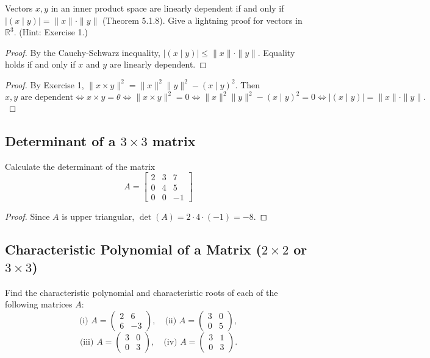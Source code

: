 \begin{tcolorbox}[title=Problem 5, breakable]
    Vectors $x, y$ in an inner product space are linearly dependent
    if and only if $|(x \mid y)| = \|x\| \cdot \|y\|$ (Theorem 5.1.8).
    Give a lightning proof for vectors in $\mathbb{R}^3$. (Hint: Exercise 1.)
\end{tcolorbox}

\begin{proof}
    By the Cauchy-Schwarz inequality, $|(x \mid y)| \le \|x\| \cdot \|y\|$.
    Equality holds if and only if $x$ and $y$ are linearly dependent.
\end{proof}

\begin{proof}
    By Exercise 1, $\|x \times y\|^2 = \|x\|^2\|y\|^2 - (x \mid y)^2$. Then
    \[x, y \text{ are dependent} \iff x \times y = \theta \iff \|x \times y\|^2 = 0 \iff \|x\|^2\|y\|^2 - (x \mid y)^2 = 0 \iff |(x \mid y)| = \|x\| \cdot \|y\|.\]
\end{proof}

\subsection{Determinant of a $3 \times 3$ matrix}

\begin{tcolorbox}[title=Problem 7, breakable]
    Calculate the determinant of the matrix 
    \[
    A = 
    \begin{bmatrix}
        2 & 3 & 7 \\
        0 & 4 & 5 \\
        0 & 0 & -1
    \end{bmatrix}
    \]
\end{tcolorbox}

\begin{proof}
    Since $A$ is upper triangular, $\det(A) = 2 \cdot 4 \cdot (-1) = -8$.
\end{proof}

\subsection{Characteristic Polynomial of a Matrix ($2 \times 2$ or $3 \times 3$)}

\begin{tcolorbox}[title=Problem 1, breakable]
Find the characteristic polynomial and characteristic roots of each of the following matrices $A$:
\[
\text{(i) } A = \begin{pmatrix}2 & 6\\6 & -3\end{pmatrix}, \quad
\text{(ii) } A = \begin{pmatrix}3 & 0\\0 & 5\end{pmatrix},
\]
\[
\text{(iii) } A = \begin{pmatrix}3 & 0\\0 & 3\end{pmatrix}, \quad
\text{(iv) } A = \begin{pmatrix}3 & 1\\0 & 3\end{pmatrix}.
\]
\end{tcolorbox}

